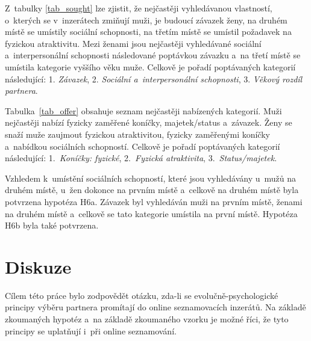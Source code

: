 \documentclass[a4paper, 12pt, notitlepage, oneside, numbers=noenddot]{report}
\begin{document}

Z~tabulky \ref{tab_sought} lze zjistit, že nejčastěji vyhledávanou
vlastností, o~kterých se v~inzerátech zmiňují muži, je budoucí závazek
ženy, na druhém místě se umístily sociální schopnosti, na třetím místě
se umístil požadavek na fyzickou atraktivitu.  Mezi ženami jsou
nejčastěji vyhledávané sociální a~interpersonální schopnosti
následované poptávkou závazku a~na třetí místě se umístila kategorie
vyššího věku muže.  Celkově je pořadí poptávaných kategorií
následující: 1. \emph{Závazek}, 2. \emph{Sociální a~interpersonální
  schopnosti}, 3. \emph{Věkový rozdíl partnera}.

Tabulka~\ref{tab_offer} obsahuje seznam nejčastěji nabízených
kategorií.  Muži nejčastěji nabízí fyzicky zaměřené koníčky,
majetek/status a~závazek.  Ženy se snaží muže zaujmout fyzickou
atraktivitou, fyzicky zaměřenými koníčky a~nabídkou sociálních
schopností.  Celkově je pořadí poptávaných kategorií následující:
1.~\emph{Koníčky: fyzické}, 2.~\emph{Fyzická atraktivita},
3.~\emph{Status/majetek}.

Vzhledem k~umístění sociálních schopností, které jsou vyhledávány
u~mužů na druhém místě, u~žen dokonce na prvním místě a~celkově na
druhém místě byla potvrzena hypotéza H6a.  Závazek byl vyhledáván muži
na prvním místě, ženami na druhém místě a~celkově se tato kategorie
umístila na první místě.  Hypotéza H6b byla také potvrzena.

\section[Diskuze]{Diskuze}

Cílem této práce bylo zodpovědět otázku, zda-li se
evolučně-psychologické principy výběru partnera promítají do online
seznamovacích inzerátů.  Na základě zkoumaných hypotéz a~na základě
zkoumaného vzorku je možné říci, že tyto principy se uplatňují i~při
online seznamování.
\end{document}
